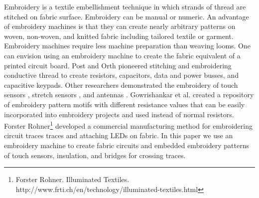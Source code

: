 Embroidery is a textile  embellishment technique in which strands of thread are stitched  on fabric surface. Embroidery can be manual or numeric. An advantage of embroidery machines is that they can create nearly arbitrary patterns on woven, non-woven, and knitted fabric including tailored textile or garment. Embroidery machines require less machine preparation than weaving looms.
One can envision using an embroidery machine to create the fabric equivalent of a printed circuit board. 
Post and Orth \cite{5387040} pioneered stitching and embroidering conductive thread to create resistors, capacitors, data and power busses, and capacitive keypads. 
Other researchers demonstrated the embroidery of touch sensors \cite{zeagler2012textile, roh2014textile,hamdan2016grabbing}, stretch sensors \cite{vogl2017stretcheband}, and antennas \cite{brechet2017cost}. Gowrishankar et al. \cite{Gowrishankar:2013:PRE:2493988.2494341} created a repository of embroidery pattern motifs
with different resistance values that can be easily incorporated into embroidery projects and used instead of normal resistors. Forster Rohner\footnote{Forster Rohner. Illuminated Textiles. http://www.frti.ch/en/technology/illuminated-textiles.html}
developed a commercial manufacturing method for embroidering circuit traces traces and attaching LEDs on fabric. 
In this paper we use an embroidery machine to create fabric circuits and embedded embroidery patterns of touch sensors, insulation, and bridges for crossing traces. 





